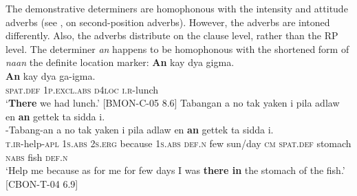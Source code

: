 The demonstrative determiners are homophonous with the intensity and attitude adverbs (see ,  on second-position adverbs). However, the adverbs are intoned differently. Also, the adverbs distribute on the clause level, rather than the RP level. The determiner \textit{an} happens to be homophonous with the shortened form of \textit{naan} the definite location marker:
\ea
\textbf{An}	kay	dya	gigma. \\\smallskip
 \gll \textbf{An}	kay	dya	ga-igma. \\
\textsc{spat.def} 	1\textsc{p.excl.abs}	\textsc{d}4\textsc{loc}	\textsc{i.r}-lunch \\
\glt ‘\textbf{There} we had lunch.’ [BMON-C-05 8.6]
\z
\ea
Tabangan	a	no	tak	yaken	i	pila	adlaw	en	\textbf{an}	gettek ta	sidda	i. \\\smallskip
 \gll \emptyset{}-Tabang-an	a	no	tak	yaken	i	pila	adlaw	en	\textbf{an}	gettek ta	sidda	i. \\
\textsc{t.ir}-help-\textsc{apl}	1\textsc{s.abs}	2\textsc{s.erg}	because	1\textsc{s.abs}	\textsc{def.n}	few	sun/day	\textsc{cm}	\textsc{spat.def}	stomach \textsc{nabs}	fish	\textsc{def.n} \\
\glt ‘Help me because as for me for few days I was \textbf{there in} the stomach of the fish.’ [CBON-T-04 6.9]
\z
{}

